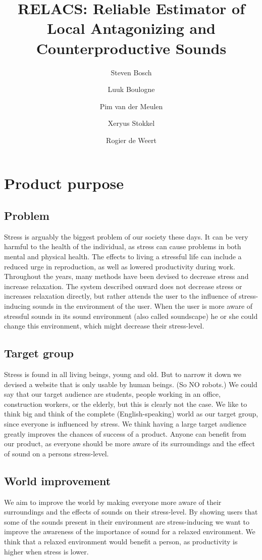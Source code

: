\documentclass[a4paper]{article}
\title{{RELACS: Reliable Estimator of Local Antagonizing and Counterproductive Sounds}}
\author{Steven Bosch \and Luuk Boulogne \and Pim van der Meulen \and Xeryus Stokkel  \and Rogier de Weert}
\begin{document}
\maketitle

\section{Product purpose}

\subsection{Problem}
Stress is arguably the biggest problem of our society these days. It can be very harmful to the health of the individual, as stress can cause problems in both mental and physical health. The effects to living a stressful life can include a reduced urge in reproduction, as well as lowered productivity during work. 
Throughout the years, many methods have been devised to decrease stress and increase relaxation. The system described onward does not decrease stress or increases relaxation directly, but rather attends the user to the influence of stress-inducing sounds in the environment of the user. When the user is more aware of stressful sounds in its sound environment (also called soundscape) he or she could change this environment, which might decrease their stress-level.

\subsection{Target group}
Stress is found in all living beings, young and old. But to narrow it down we devised a website that is only usable by human beings. 
(So NO robots.)
We could say that our target audience are students, people working in an office, construction workers, or the elderly, but this is clearly not the case. 
We like to think big and think of the complete (English-speaking) world as our target group, since everyone is influenced by stress. 
We think having a large target audience greatly improves the chances of success of a product. 
Anyone can benefit from our product, as everyone should be more aware of its surroundings and the effect of sound on a persons stress-level. 

\subsection{World improvement}
We aim to improve the world by making everyone more aware of their surroundings and the effects of sounds on their stress-level. 
By showing users that some of the sounds present in their environment are stress-inducing we want to improve the awareness of the importance of sound for a relaxed environment. 
We think that a relaxed environment would benefit a person, as productivity is higher when stress is lower.
\end{document}
